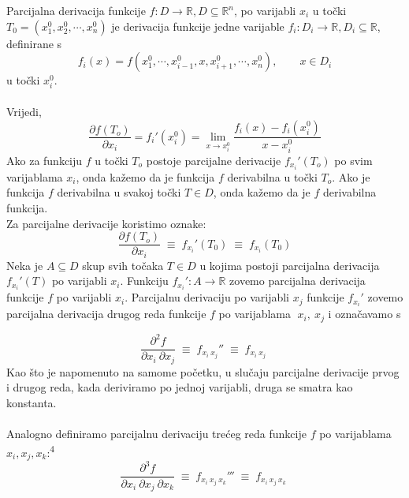 \documentclass{article}
\begin{document}
Parcijalna derivacija funkcije $f:D\rightarrow \mathbb{R} , D \subseteq \mathbb{R}^n$, po varijabli $x_i$
u točki $T_0=(x_1^0, x_2^0,\cdots , x_n^0)$ je derivacija funkcije jedne varijable
$f_i:D_i \rightarrow \mathbb{R} , D_i \subseteq \mathbb{R}$, definirane s
 $$f_i(x)=f(x_1^0, \cdots , x_{i-1}^0, x, x_{i+1}^0,\cdots , x_n^0), \quad \quad x \in D_i$$ u točki $x_i^0$. 
\\~\\
Vrijedi,
\begin{equation*}
    \frac{\partial f (T_o)}{\partial x_i}=f_i '(x_i^0)=\displaystyle{\lim_{x \to x_i^0}}\frac{f_i(x)-f_i(x_i^0)}{x-x_i^0}
\end{equation*}
Ako za funkciju $f$ u točki $T_o$ postoje parcijalne derivacije $f_{x_i} '(T_o)$ po svim varijablama $x_i$, onda kažemo da je funkcija $f$ derivabilna u točki $T_o$. Ako je funkcija $f$ derivabilna u svakoj točki $T \in D$, onda kažemo da je $f$ derivabilna funkcija.
\\
Za parcijalne derivacije koristimo oznake:
\begin{equation*}
    \frac{\partial f (T_o)}{\partial x_i} \; \equiv \; f_{x_i} '(T_0) \; \equiv \; f_{x_i} (T_0)
\end{equation*}
Neka je $A \subseteq D$ skup svih točaka $T \in D$ u kojima postoji parcijalna
derivacija $f_{x_i} '(T)$ po varijabli $x_i$. Funkciju $f_{x_i} ' : A \rightarrow \mathbb{R}$ zovemo
parcijalna derivacija funkcije $f$ po varijabli $x_i$. Parcijalnu derivaciju
po varijabli $x_j$
funkcije $f_{x_i} '$
zovemo parcijalna derivacija drugog reda
funkcije $f$ po varijablama $\; x_i
, \: x_j$ i označavamo s

\begin{equation*}
    \frac{\partial^2 f }{\partial x_i \: \partial x_j} \; \equiv \; f_{x_i \: x_j} '' \; \equiv \; f_{x_i \: x_j}\; 
\end{equation*}
Kao što je napomenuto na samome početku, u slučaju parcijalne derivacije prvog i drugog reda, kada deriviramo po jednoj varijabli, druga se smatra kao konstanta.
\\~\\
Analogno definiramo parcijalnu derivaciju trećeg reda funkcije $f$ po
varijablama $x_i, x_j, x_k$:\textsuperscript{4}
\begin{equation*}
    \frac{\partial^3 f }{\partial x_i \: \partial x_j \: \partial x_k} \; \equiv \; f_{x_i \: x_j \: x_k} ''' \; \equiv \; f_{x_i \: x_j \: x_k}\;
\end{equation*}
\end{document}
